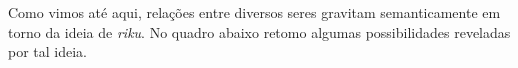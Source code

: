 Como vimos até aqui, relações entre diversos seres gravitam
semanticamente em torno da ideia de \emph{riku}. No quadro abaixo retomo
algumas possibilidades reveladas por tal ideia.




